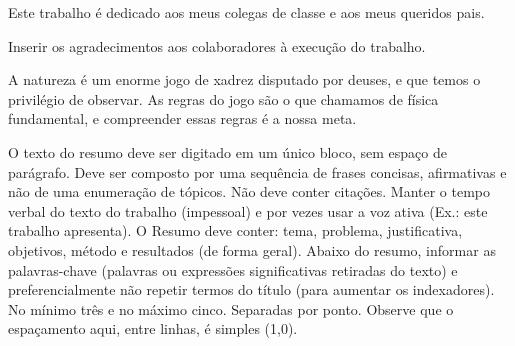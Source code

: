 \documentclass[
12pt,				%
oneside,			%
a4paper,			%
chapter=TITLE,		%
section=TITLE,		%
english,			%
brazil				%
hyperref=hidelinks]{abntex2}
\begin{document}
\imprimircapa

\imprimirfolhaderosto

\begin{folhadeaprovacao}
\end{folhadeaprovacao}

\begin{dedicatoria}
    Este trabalho é dedicado aos meus colegas de classe e aos meus queridos pais.
\end{dedicatoria}

\begin{agradecimentos}
    Inserir os agradecimentos aos colaboradores à execução do trabalho.
\end{agradecimentos}

\begin{epigrafe}
    \aspas
    A natureza é um enorme jogo de xadrez disputado por deuses, e que temos o privilégio de observar.
    As regras do jogo são o que chamamos de física fundamental, e compreender essas regras é a nossa meta.
    \aspas
\end{epigrafe}

\begin{resumo}
    O texto do resumo deve ser digitado em um único bloco, sem espaço de parágrafo. Deve ser composto por uma sequência de frases concisas, afirmativas e não de uma enumeração de tópicos. Não deve conter citações. Manter o tempo verbal do texto do trabalho (impessoal) e por vezes usar a voz ativa (Ex.: este trabalho apresenta). O Resumo deve conter: tema, problema, justificativa, objetivos, método e resultados (de forma geral). Abaixo do resumo, informar as palavras-chave (palavras ou expressões significativas retiradas do texto) e preferencialmente não repetir termos do título (para aumentar os indexadores). No mínimo três e no máximo cinco. Separadas por ponto. Observe que o espaçamento aqui, entre linhas, é simples (1,0).

\end{resumo}
\end{document}
